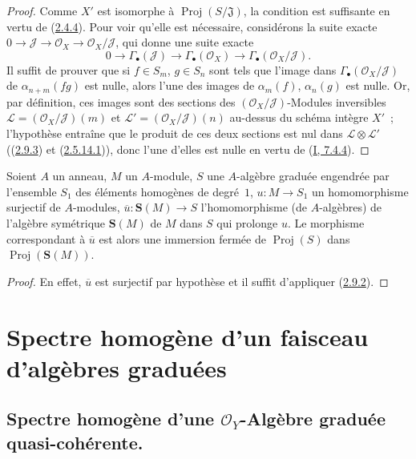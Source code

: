 
\begin{proof}
Comme $X'$ est isomorphe à $\operatorname{Proj}(S/\mathfrak{J})$, la
condition est suffisante en vertu de (\hyperref[II.2.4.4-fr]{2.4.4}). Pour
voir qu'elle est nécessaire, considérons la suite exacte
$0\to\mathcal{J}\to\mathcal{O}_X\to\mathcal{O}_X/\mathcal{J}$, qui donne une
suite exacte
\[
  0\longrightarrow\Gamma_\bullet(\mathcal{J})
  \longrightarrow\Gamma_\bullet(\mathcal{O}_X)
  \longrightarrow\Gamma_\bullet(\mathcal{O}_X/\mathcal{J}).
\]
Il suffit de prouver que si $f\in S_m$, $g\in S_n$ sont tels que l'image dans
$\Gamma_\bullet(\mathcal{O}_X/\mathcal{J})$ de $\alpha_{n+m}(fg)$ est nulle,
alors l'une des images de $\alpha_m(f)$, $\alpha_n(g)$ est nulle. Or, par
définition, ces images sont des sections des
$(\mathcal{O}_X/\mathcal{J})$-Modules inversibles
$\mathcal{L}=(\mathcal{O}_X/\mathcal{J})(m)$ et
$\mathcal{L}'=(\mathcal{O}_X/\mathcal{J})(n)$ au-dessus du schéma intègre
$X'$~; l'hypothèse entraîne que le produit de ces deux sections est nul dans
$\mathcal{L}\otimes\mathcal{L}'$
((\hyperref[II.2.9.3-fr]{2.9.3}) et
(\hyperref[II.2.5.14.1-fr]{2.5.14.1})), donc l'une d'elles est nulle en vertu
de (\hyperref[I.7.4.4-fr]{I, 7.4.4}).
\end{proof}

\begin{corollary}[2.9.5]
\label{II.2.9.5-fr}
Soient $A$ un anneau, $M$ un $A$-module, $S$ une $A$-algèbre graduée
engendrée par l'ensemble $S_1$ des éléments homogènes de degré~$1$,
$u:M\to S_1$ un homomorphisme surjectif de $A$-modules,
$\overline{u}:\mathbf{S}(M)\to S$ l'homomorphisme (de $A$-algèbres) de
l'algèbre symétrique $\mathbf{S}(M)$ de $M$ dans $S$ qui prolonge $u$. Le
morphisme correspondant à $\overline{u}$ est alors une immersion fermée de
$\operatorname{Proj}(S)$ dans $\operatorname{Proj}(\mathbf{S}(M))$.
\end{corollary}

\begin{proof}
En effet, $\overline{u}$ est surjectif par hypothèse et il suffit d'appliquer
(\hyperref[II.2.9.2-fr]{2.9.2}).
\end{proof}

\section{Spectre homogène d'un faisceau d'algèbres graduées}
\label{section:II.3-fr}

\subsection{Spectre homogène d'une $\mathcal{O}_Y$-Algèbre graduée
quasi-cohérente.}
\label{subsection:II.3.1-fr}
\label{II.3.1-fr}

